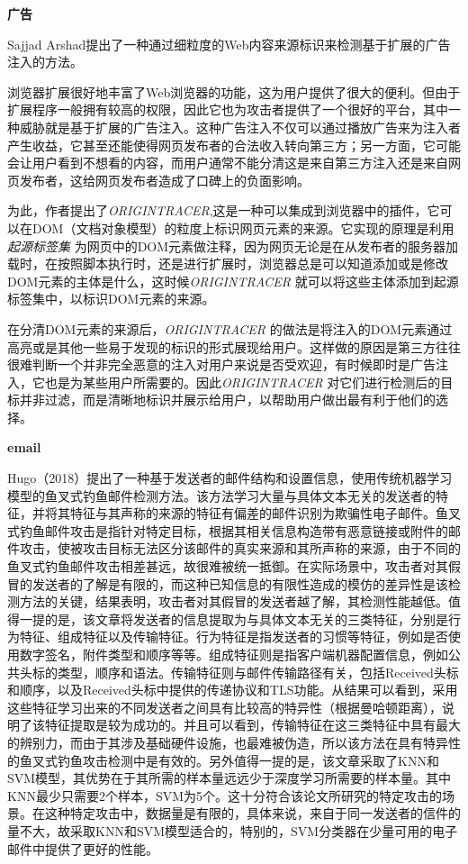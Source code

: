 \documentclass[12pt]{article} %
\begin{document}
\textbf{广告}

Sajjad Arshad提出了一种通过细粒度的Web内容来源标识来检测基于扩展的广告注入的方法。

浏览器扩展很好地丰富了Web浏览器的功能，这为用户提供了很大的便利。但由于扩展程序一般拥有较高的权限，因此它也为攻击者提供了一个很好的平台，其中一种威胁就是基于扩展的广告注入。这种广告注入不仅可以通过播放广告来为注入者产生收益，它甚至还能使得网页发布者的合法收入转向第三方；另一方面，它可能会让用户看到不想看的内容，而用户通常不能分清这是来自第三方注入还是来自网页发布者，这给网页发布者造成了口碑上的负面影响。

为此，作者提出了\textit{ORIGINTRACER},这是一种可以集成到浏览器中的插件，它可以在DOM（文档对象模型）的粒度上标识网页元素的来源。它实现的原理是利用 \textit{起源标签集} 为网页中的DOM元素做注释，因为网页无论是在从发布者的服务器加载时，在按照脚本执行时，还是进行扩展时，浏览器总是可以知道添加或是修改DOM元素的主体是什么，这时候\textit{ORIGINTRACER} 就可以将这些主体添加到起源标签集中，以标识DOM元素的来源。

在分清DOM元素的来源后，\textit{ORIGINTRACER} 的做法是将注入的DOM元素通过高亮或是其他一些易于发现的标识的形式展现给用户。这样做的原因是第三方往往很难判断一个并非完全恶意的注入对用户来说是否受欢迎，有时候即时是广告注入，它也是为某些用户所需要的。因此\textit{ORIGINTRACER} 对它们进行检测后的目标并非过滤，而是清晰地标识并展示给用户，以帮助用户做出最有利于他们的选择。

\textbf{email}

Hugo（2018）提出了一种基于发送者的邮件结构和设置信息，使用传统机器学习模型的鱼叉式钓鱼邮件检测方法。该方法学习大量与具体文本无关的发送者的特征，并将其特征与其声称的来源的特征有偏差的邮件识别为欺骗性电子邮件。鱼叉式钓鱼邮件攻击是指针对特定目标，根据其相关信息构造带有恶意链接或附件的邮件攻击，使被攻击目标无法区分该邮件的真实来源和其所声称的来源，由于不同的鱼叉式钓鱼邮件攻击相差甚远，故很难被统一抵御。在实际场景中，攻击者对其假冒的发送者的了解是有限的，而这种已知信息的有限性造成的模仿的差异性是该检测方法的关键，结果表明，攻击者对其假冒的发送者越了解，其检测性能越低。值得一提的是，该文章将发送者的信息提取为与具体文本无关的三类特征，分别是行为特征、组成特征以及传输特征。行为特征是指发送者的习惯等特征，例如是否使用数字签名，附件类型和顺序等等。组成特征则是指客户端机器配置信息，例如公共头标的类型，顺序和语法。传输特征则与邮件传输路径有关，包括Received头标和顺序，以及Received头标中提供的传递协议和TLS功能。从结果可以看到，采用这些特征学习出来的不同发送者之间具有比较高的特异性（根据曼哈顿距离），说明了该特征提取是较为成功的。并且可以看到，传输特征在这三类特征中具有最大的辨别力，而由于其涉及基础硬件设施，也最难被伪造，所以该方法在具有特异性的鱼叉式钓鱼攻击检测中是有效的。另外值得一提的是，该文章采取了KNN和SVM模型，其优势在于其所需的样本量远远少于深度学习所需要的样本量。其中KNN最少只需要2个样本，SVM为5个。这十分符合该论文所研究的特定攻击的场景。在这种特定攻击中，数据量是有限的，具体来说，来自于同一发送者的信件的量不大，故采取KNN和SVM模型适合的，特别的，SVM分类器在少量可用的电子邮件中提供了更好的性能。
\end{document}
